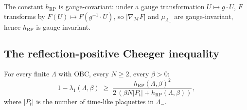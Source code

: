 The constant $h_{\mathrm{RP}}$ is gauge-covariant: under a gauge
transformation $U\mapsto g\cdot U$, $F$ transforms by
$F(U)\mapsto F(g^{-1}\cdot U)$, so $|\nabla_{\mathcal{M}}F|$ and
$\mu_{\Lambda_{-}}$ are gauge-invariant, hence
$h_{\mathrm{RP}}$ is gauge-invariant.

\subsection{The reflection-positive Cheeger inequality}
\label{ssec:rp_cheeger_ineq}

\begin{theorem}
\label{thm:rp_cheeger}
For every finite $\Lambda$ with OBC, every $N\ge 2$, every $\beta>0$:
\begin{equation}
\label{eq:rp_cheeger}
  1-\lambda_{1}(\Lambda,\beta)
  \;\ge\;
  \frac{h_{\mathrm{RP}}(\Lambda,\beta)^{2}}
       {2\,(\beta N|P_{t}|+h_{\mathrm{RP}}(\Lambda,\beta))},
\end{equation}
where $|P_{t}|$ is the number of time-like plaquettes in
$\Lambda_{-}$.
\end{theorem}


